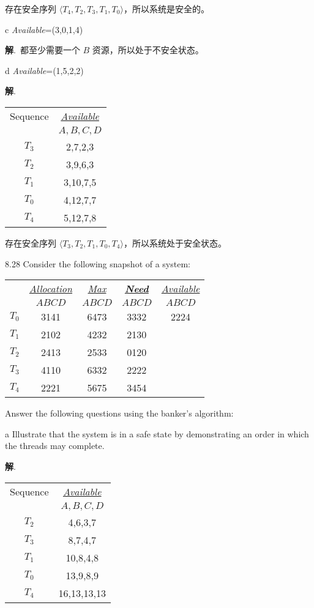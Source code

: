 \documentclass[12pt,a4paper]{article}
\newenvironment{problems}{\begin{list}{}{\renewcommand{\makelabel}[1]{\textbf{##1}\hfil}}}{\end{list}}
\newenvironment{steps}{\begin{list}{}{\renewcommand{\makelabel}[1]{##1.\hfil}}}{\end{list}}
\providecommand{\sol}{\textbf{解}.~}
\begin{document}
\begin{problems}
\begin{steps}
      存在安全序列 $\langle T_4,T_2,T_3,T_1,T_0\rangle$，所以系统是安全的。
    \item[c] \emph{Available}=(3,0,1,4)
    
    \sol 都至少需要一个 $B$ 资源，所以处于不安全状态。

    \item[d] \emph{Available}=(1,5,2,2)   
    
    \sol  \begin{tabular}{cc}
        Sequence  & \underline{\emph{Available}} \\
          & $A,B,C,D$ \\
      $T_3$ & 2,7,2,3 \\
      $T_2$ & 3,9,6,3 \\
      $T_1$ & 3,10,7,5\\
      $T_0$ & 4,12,7,7\\
      $T_4$ & 5,12,7,8
      \end{tabular} 

      存在安全序列 $\langle T_3,T_2,T_1,T_0,T_4\rangle $，所以系统处于安全状态。
   \end{steps}
    \item[8.28] Consider the following snapshot of a system:
    
    \begin{tabular}{ccccc}
        & \underline{\emph{Allocation}} & \underline{\emph{Max}}  & \underline{\textbf{\emph{Need}}} &  \underline{\emph{Available}}\\
        & $ABCD$ & $ABCD$ & $ABCD$ & $ABCD$\\
   $T_0$ & 3141 & 6473& 3332 &2224\\
   $T_1$ & 2102 & 4232& 2130 &\\
   $T_2$ & 2413 & 2533& 0120 &\\
   $T_3$ & 4110 & 6332& 2222 &\\
   $T_4$ & 2221 & 5675& 3454 &
   \end{tabular} 

   Answer the following questions using the banker's algorithm:
   \begin{steps}
       \item[a] Illustrate that the system is in a safe state by demonstrating an order in which the threads may complete.
       
       \sol \begin{tabular}{cc}
        Sequence  & \underline{\emph{Available}} \\
          & $A,B,C,D$ \\
      $T_2$ & 4,6,3,7 \\
      $T_3$ & 8,7,4,7 \\
      $T_1$ & 10,8,4,8 \\
      $T_0$ & 13,9,8,9 \\
      $T_4$ & 16,13,13,13
      \end{tabular} 


\end{steps}
\end{problems}
\end{document}
